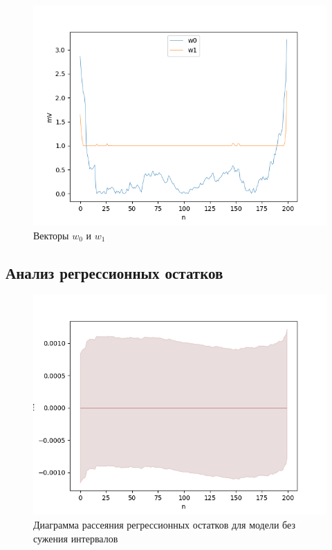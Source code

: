 \begin{figure}[H]
	\begin{center}
		\includegraphics[scale = 0.55]{resources/w0_w1.png}
	\end{center}
	\caption{Векторы $w_0$ и $w_1$} \label{pic:w0_w1}
\end{figure}

\subsection{Анализ регрессионных остатков}

\begin{figure}[H]
	\begin{center}
		\includegraphics[scale = 0.55]{resources/analysis_of_regression_residuals_1.png}
	\end{center}
	\caption{Диаграмма рассеяния регрессионных остатков для модели без сужения интервалов} \label{pic:without_reduction}
\end{figure}

